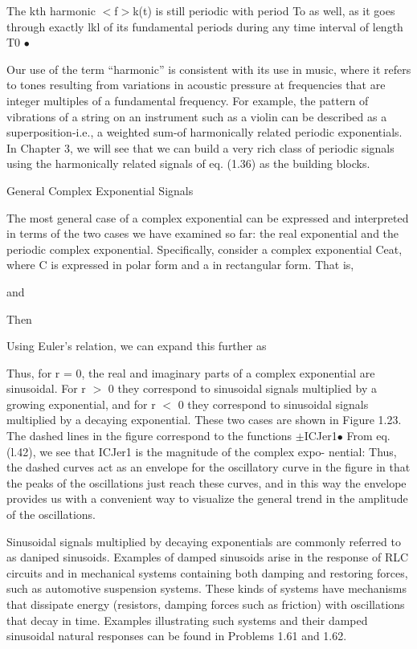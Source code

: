 \documentclass{report}
\begin{document}
The kth harmonic $<$f$>$k(t) is still periodic with period To as well, as it goes through exactly lkl of its fundamental periods during any time
interval of length T0 $\bullet $

Our use of the term {``}harmonic{''} is consistent with its use in music, where it refers to tones resulting from variations in acoustic pressure
at frequencies that are integer multiples of a fundamental frequency. For example, the pattern of vibrations of a string on an instrument such as
a violin can be described as a superposition-i.e., a weighted sum-of harmonically related periodic exponentials. In Chapter 3, we will see that we
can build a very rich class of periodic signals using the harmonically related signals of eq. (1.36) as the building blocks.

General Complex Exponential Signals

The most general case of a complex exponential can be expressed and interpreted in terms of the two cases we have examined so far: the real exponential
and the periodic complex exponential. Specifically, consider a complex exponential Ceat, where C is expressed in polar form and a in rectangular
form. That is,



and



Then



Using Euler{'}s relation, we can expand this further as



Thus, for r = 0, the real and imaginary parts of a complex exponential are sinusoidal. For r $>$ 0 they correspond to sinusoidal signals multiplied
by a growing exponential, and for r $<$ 0 they correspond to sinusoidal signals multiplied by a decaying exponential. These two cases are shown in
Figure 1.23. The dashed lines in the figure correspond to the functions $\pm $ICJer1$\bullet $ From eq. (l.42), we see that ICJer1 is the magnitude
of the complex expo- nential: Thus, the dashed curves act as an envelope for the oscillatory curve in the figure in that the peaks of the oscillations
just reach these curves, and in this way the envelope provides us with a convenient way to visualize the general trend in the amplitude of the oscillations.



Sinusoidal signals multiplied by decaying exponentials are commonly referred to as daniped sinusoids. Examples of damped sinusoids arise in the response
of RLC circuits and in mechanical systems containing both damping and restoring forces, such as automotive suspension systems. These kinds of systems
have mechanisms that dissipate energy (resistors, damping forces such as friction) with oscillations that decay in time. Examples illustrating such
systems and their damped sinusoidal natural responses can be found in Problems 1.61 and 1.62.
\end{document}

